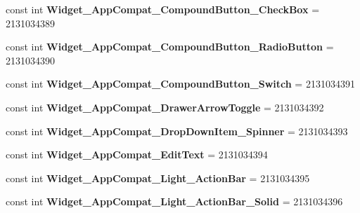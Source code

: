 \begin{DoxyCompactItemize}
\item 
\hypertarget{classClient_1_1Droid_1_1Resource_1_1Style_a26df1e27101b69ade5b6ae9539dfe630}{}const int {\bfseries Widget\+\_\+\+App\+Compat\+\_\+\+Compound\+Button\+\_\+\+Check\+Box} = 2131034389\label{classClient_1_1Droid_1_1Resource_1_1Style_a26df1e27101b69ade5b6ae9539dfe630}

\item 
\hypertarget{classClient_1_1Droid_1_1Resource_1_1Style_ac71047a2f038264046f766ec890432ba}{}const int {\bfseries Widget\+\_\+\+App\+Compat\+\_\+\+Compound\+Button\+\_\+\+Radio\+Button} = 2131034390\label{classClient_1_1Droid_1_1Resource_1_1Style_ac71047a2f038264046f766ec890432ba}

\item 
\hypertarget{classClient_1_1Droid_1_1Resource_1_1Style_aaa8df6d366e35e5442c1ac7b5891b07f}{}const int {\bfseries Widget\+\_\+\+App\+Compat\+\_\+\+Compound\+Button\+\_\+\+Switch} = 2131034391\label{classClient_1_1Droid_1_1Resource_1_1Style_aaa8df6d366e35e5442c1ac7b5891b07f}

\item 
\hypertarget{classClient_1_1Droid_1_1Resource_1_1Style_aacf1ba86433825f9eaef51ffebcfe8f1}{}const int {\bfseries Widget\+\_\+\+App\+Compat\+\_\+\+Drawer\+Arrow\+Toggle} = 2131034392\label{classClient_1_1Droid_1_1Resource_1_1Style_aacf1ba86433825f9eaef51ffebcfe8f1}

\item 
\hypertarget{classClient_1_1Droid_1_1Resource_1_1Style_a28927fc81b4e1fc0c124aae4691f9853}{}const int {\bfseries Widget\+\_\+\+App\+Compat\+\_\+\+Drop\+Down\+Item\+\_\+\+Spinner} = 2131034393\label{classClient_1_1Droid_1_1Resource_1_1Style_a28927fc81b4e1fc0c124aae4691f9853}

\item 
\hypertarget{classClient_1_1Droid_1_1Resource_1_1Style_afed329068c934ba14191bd6485c5262b}{}const int {\bfseries Widget\+\_\+\+App\+Compat\+\_\+\+Edit\+Text} = 2131034394\label{classClient_1_1Droid_1_1Resource_1_1Style_afed329068c934ba14191bd6485c5262b}

\item 
\hypertarget{classClient_1_1Droid_1_1Resource_1_1Style_afe4118efa1b8a69a21b8cf1030fe3dd0}{}const int {\bfseries Widget\+\_\+\+App\+Compat\+\_\+\+Light\+\_\+\+Action\+Bar} = 2131034395\label{classClient_1_1Droid_1_1Resource_1_1Style_afe4118efa1b8a69a21b8cf1030fe3dd0}

\item 
\hypertarget{classClient_1_1Droid_1_1Resource_1_1Style_a92bb3eeb8078424ede11a92a08411c81}{}const int {\bfseries Widget\+\_\+\+App\+Compat\+\_\+\+Light\+\_\+\+Action\+Bar\+\_\+\+Solid} = 2131034396\label{classClient_1_1Droid_1_1Resource_1_1Style_a92bb3eeb8078424ede11a92a08411c81}


\end{DoxyCompactItemize}
